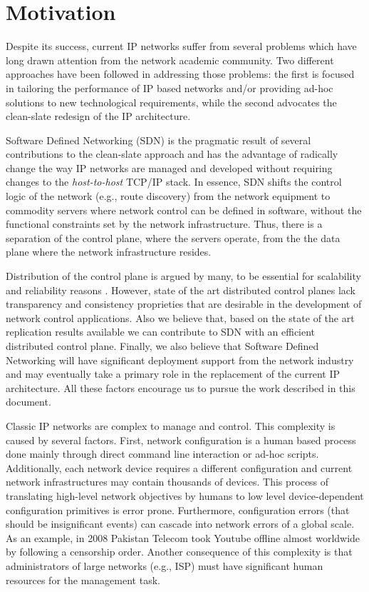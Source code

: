 
\section{Motivation}
Despite its success, current IP networks suffer from several problems 
which have long drawn attention from the network academic community. Two different approaches have been followed in addressing those problems: the first is focused in tailoring the performance of IP based networks and/or providing ad-hoc solutions to new technological requirements, while the second  advocates the clean-slate redesign of the IP architecture. 

Software Defined Networking (SDN) \cite{ONF:2012ui} is the pragmatic result of several contributions to the clean-slate approach and has the advantage of radically change the way IP networks are managed and developed without requiring changes to the \emph{host-to-host} TCP/IP stack. In essence, SDN shifts the control logic of the network (e.g., route discovery) from the network equipment to commodity servers where network control can  be defined in software, without the functional constraints set by the network infrastructure. Thus, there is a separation of the control plane, where the servers operate, from the the data plane where the network infrastructure resides. 

Distribution of the control plane is argued by many, to be essential for scalability and reliability reasons \cite{Tootoonchian:2010vy, Koponen:2010th,Yeganeh:2012jm,:zr}. However, state of the art  distributed control planes lack transparency and consistency proprieties that are desirable in the development of network control applications. Also we believe that, based on the state of the art replication results available \cite{Rao:2011vz,Lee:1996jm,Bolosky:2011ve,Wang:2012tj} we can contribute to SDN with an efficient distributed control plane. Finally, we also believe that Software Defined Networking will have significant deployment support from the network industry and may eventually take a primary role in the replacement of the current IP architecture. All these factors  encourage us to pursue the work described in this document.



Classic IP networks are complex to manage and control. This complexity is caused by several factors. First, network configuration is a human based process done mainly through direct command line interaction or ad-hoc scripts. Additionally, each network device requires a different configuration and current network infrastructures may contain thousands of devices. This process of translating high-level network objectives by humans to low level device-dependent configuration primitives is error prone. Furthermore, configuration errors (that should be insignificant events) can cascade into network errors of a global scale. As an example, in 2008 Pakistan Telecom took Youtube offline almost worldwide \cite{McCullagh:2008fk} by following a censorship order. Another consequence of this complexity is that administrators of large networks (e.g., ISP)  must have significant human resources for the management task.  

